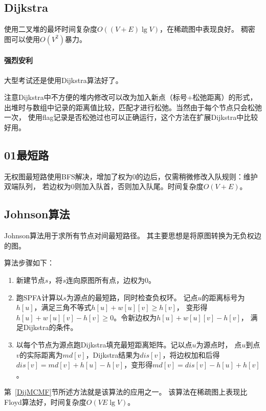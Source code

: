\subsection{Dijkstra}
使用二叉堆的最坏时间复杂度$O((V+E)\lg V)$，在稀疏图中表现良好。
稠密图可以使用$O(V^2)$暴力。
\paragraph{强烈安利}
大型考试还是使用Dijkstra算法好了。

注意Dijkstra中不方便的堆内修改可以改为加入新点（标号+松弛距离）的形式，
出堆时与数组中记录的距离值比较，匹配才进行松弛。当然由于每个节点只会松弛一次，
使用flag记录是否松弛过也可以正确运行，这个方法在扩展Dijkstra中比较好用。
\subsection{01最短路}
无权图最短路使用BFS解决，增加了权为0的边后，仅需稍微修改入队规则：维护双端队列，
若边权为0则加入队首，否则加入队尾。时间复杂度$O(V+E)$。
\subsection{Johnson算法}
Johnson算法用于求所有节点对间最短路径。
其主要思想是将原图转换为无负权边的图。

算法步骤如下：
\begin{enumerate}
    \item 新建节点$s$，将$s$连向原图所有点，边权为0。
    \item 跑SPFA计算以$s$为源点的最短路，同时检查负权环。
    记点$u$的距离标号为$h[u]$，满足三角不等式$h[u]+w[u][v]\geq h[v]$，
    变形得$h[u]+w[u][v]-h[v]\geq 0$。令新边权为$h[u]+w[u][v]-h[v]$，
    满足Dijkstra的条件。
    \item 以每个节点为源点跑Dijkstra填充最短距离矩阵。记以点$u$为源点时，
    点$u$到点$v$的实际距离为$md[v]$，Dijkstra结果为$dis[v]$，将边权加和后得
    $dis[v]=md[v]+h[u]-h[v]$，变形得$md[v]=dis[v]-h[u]+h[v]$。
\end{enumerate}

第~\ref{DijMCMF}节所述方法就是该算法的应用之一。
该算法在稀疏图上表现比Floyd算法好，时间复杂度$O(VE\lg V)$。
